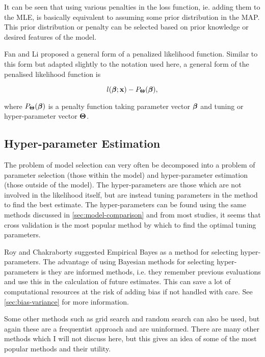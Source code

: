 It can be seen that using various penalties in the loss function, ie. adding them to the MLE, is basically equivalent to assuming some prior distribution in the MAP. This prior distribution or penalty can be selected based on prior knowledge or desired features of the model.

Fan and Li  proposed a general form of a penalized likelihood function. Similar to this form but adapted slightly to the notation used here, a general form of the penalised likelihood function is

\begin{equation}\label{eqn:general-penalised-likelihood}
    l(\boldsymbol{\beta};\textbf{x})-P_{\boldsymbol{\Theta}}(\boldsymbol{\beta}),
\end{equation}

where $P_{\boldsymbol{\Theta}}(\boldsymbol{\beta})$ is a penalty function taking parameter vector $\boldsymbol{\beta}$ and tuning or hyper-parameter vector $\boldsymbol{\Theta}$.

\subsection{Hyper-parameter Estimation}\label{sec:hyper-parameter-estimation}

The problem of model selection can very often be decomposed into a problem of parameter selection (those within the model) and hyper-parameter estimation (those outside of the model). The hyper-parameters are those which are not involved in the likelihood itself, but are instead tuning parameters in the method to find the best estimate. The hyper-parameters can be found using the same methods discussed in \cref{sec:model-comparison} and from most studies, it seems that cross validation is the most popular method by which to find the optimal tuning parameters. 

Roy and Chakraborty  suggested Empirical Bayes as a method for selecting hyper-parameters. The advantage of using Bayesian methods for selecting hyper-parameters is they are informed methods, i.e. they remember previous evaluations and use this in the calculation of future estimates. This can save a lot of computational resources at the risk of adding bias if not handled with care. See \cref{sec:bias-variance} for more information.

Some other methods such as grid search and random search can also be used, but again these are a frequentist approach and are uninformed. There are many other methods which I will not discuss here, but this gives an idea of some of the most popular methods and their utility.

